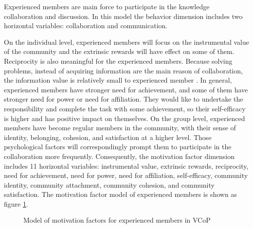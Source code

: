 \documentclass{elsarticle}
\begin{document}
 Experienced members are main force to
 participate in the knowledge collaboration and discussion. In this model the behavior
 dimension includes two horizontal variables: collaboration and
 communication. 

   On the individual level, experienced members will focus on the
   instrumental value of the community and the extrinsic rewards will
   have effect on some of them. Reciprocity is also meaningful for the
   experienced members. Because 
   solving problems, instead of acquiring information are the main
   reason of collaboration, the information
   value is relatively small to experienced member . In general,
   experienced members have stronger need for achievement, and some of
   them have stronger need for power or need for affiliation. They
   would like to undertake the responsibility and complete the task
   with some achievement, so their self-efficacy is higher and has
   positive impact on themselves. On the group level, experienced
   members have become regular members in the community, with their
   sense of identity, belonging, cohesion, and satisfaction at a
   higher level. Those psychological factors will correspondingly
   prompt them to participate in the collaboration more
   frequently. Consequently, the motivation factor dimension includes
   11 horizontal variables: instrumental value, extrinsic rewards,
   reciprocity, need for achievement, need for power, need for
   affiliation, self-efficacy, community identity, community
   attachment, community cohesion, and community satisfaction. The
   motivation factor model of experienced members is shown as figure
   \ref{fig:senior member}.
\begin{figure}[htpb]
  \centering
  \label{fig:senior member}
  \caption{Model of motivation factors for experienced
    members in VCoP}
\end{figure}
\end{document}
